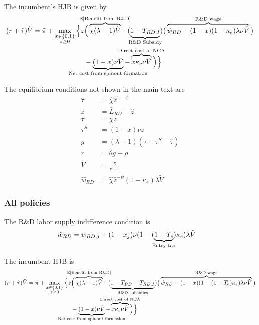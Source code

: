 \documentclass[11pt,english]{article}
\begin{document}
The incumbent's HJB is given by
\begin{align}
(r + \hat{\tau}) \tilde{V} = \tilde{\pi} + \max_{\substack{x \in \{0,1\} \\ z \ge 0}} \Big\{z &\Big( \overbrace{\chi (\lambda - 1) \tilde{V}}^{\mathclap{\mathbb{E}[\textrm{Benefit from R\&D}]}}- (\underbrace{1-T_{RD,I}}_{\mathclap{\text{R\&D Subsidy}}}) \big( \overbrace{\hat{w}_{RD} - (1-x)(1-\kappa_e)\lambda \nu \tilde{V}}^{\mathclap{\text{R\&D wage}}}\big) \label{eq:hjb_incumbent_RDsubsidyTargeted} \nonumber \\ 
&-  \underbrace{(1-x) \nu \tilde{V}}_{\mathclap{\text{Net cost from spinout formation}}} - \overbrace{x \kappa_{c} \nu \tilde{V}}^{\mathclap{\text{Direct cost of NCA}}}\Big) \Big\} 
\end{align}

The equilibrium conditions not shown in the main text are
\begin{align}
\hat{\tau} &= \hat{\chi} \hat{z}^{1-\psi} \\
z &= \bar{L}_{RD} - \hat{z} \label{eq:labor_resource_constraint_RDsubsidyTargeted}\\ 
\tau &= \chi z \\
\tau^S &= (1-x) \nu z \\
g &= (\lambda - 1) (\tau + \tau^S + \hat{\tau}) \\
r &= \theta g + \rho \\
\tilde{V} &= \frac{\tilde{\pi}}{r + \hat{\tau}} \\ 
\hat{w}_{RD} &= \hat{\chi} \hat{z}^{-\psi} (1-\kappa_e) \lambda \tilde{V} \label{eq:wage_rd_labor_RDsubsidyTargeted}
\end{align}



\subsubsection{All policies}\label{appendix:model:efficiencyderivations:allPolicies}

The R\&D labor supply indifference condition is
\begin{align}
\hat{w}_{RD} &= w_{RD,j} + (1-x_j) \nu (1-(\underbrace{1+T_e}_{\mathclap{\text{Entry tax}}})\kappa_e) \lambda \tilde{V} \label{eq:RD_worker_indifference_all}
\end{align}

The incumbent HJB is
\begin{align}
(r + \hat{\tau}) \tilde{V} = \tilde{\pi} + \max_{\substack{x \in \{0,1\} \\ z \ge 0}} \Big\{z &\Big( \overbrace{\chi (\lambda - 1) \tilde{V}}^{\mathclap{\mathbb{E}[\textrm{Benefit from R\&D}]}}-  (\underbrace{1 - T_{RD} - T_{RD,I}}_{\mathclap{\text{R\&D subsidies}}})\big( \overbrace{\hat{w}_{RD} - (1-x)(1-(1+T_e)\kappa_e)\lambda \nu \tilde{V}}^{\mathclap{\text{R\&D wage}}}\big) \label{eq:hjb_incumbent_all} \nonumber \\ 
&-  \underbrace{(1-x) \nu \tilde{V}}_{\mathclap{\text{Net cost from spinout formation}}} - \overbrace{x \kappa_{c} \nu \tilde{V}}^{\mathclap{\text{Direct cost of NCA}}}\Big) \Big\} 
\end{align}
\end{document}
